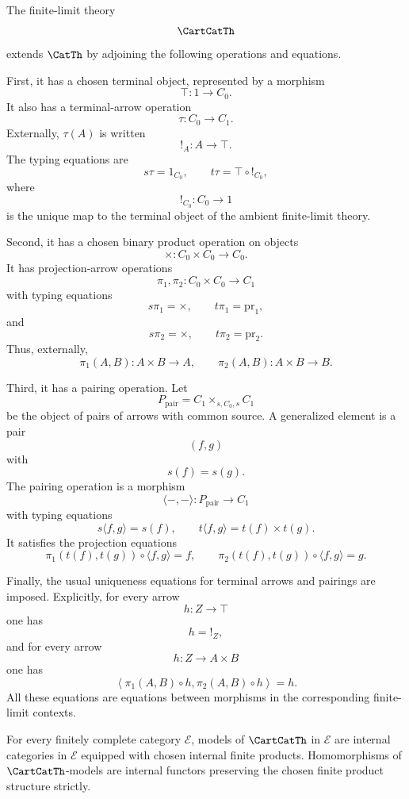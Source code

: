 \begin{definition}
\label{def:cartcatth}
The finite-limit theory
\[
\CartCatTh
\]
extends \(\CatTh\) by adjoining the following operations and equations.

First, it has a chosen terminal object, represented by a morphism
\[
\top:1\to C_0.
\]
It also has a terminal-arrow operation
\[
\tau:C_0\to C_1.
\]
Externally, \(\tau(A)\) is written
\[
!_A:A\to \top.
\]
The typing equations are
\[
s\tau=1_{C_0},
\qquad
t\tau=\top\circ {!}_{C_0},
\]
where
\[
{!}_{C_0}:C_0\to 1
\]
is the unique map to the terminal object of the ambient finite-limit theory.

Second, it has a chosen binary product operation on objects
\[
\times:C_0\times C_0\to C_0.
\]
It has projection-arrow operations
\[
\pi_1,\pi_2:C_0\times C_0\to C_1
\]
with typing equations
\[
s\pi_1=\times,
\qquad
t\pi_1=\mathrm{pr}_1,
\]
and
\[
s\pi_2=\times,
\qquad
t\pi_2=\mathrm{pr}_2.
\]
Thus, externally,
\[
\pi_1(A,B):A\times B\to A,
\qquad
\pi_2(A,B):A\times B\to B.
\]

Third, it has a pairing operation.  Let
\[
P_{\mathrm{pair}}
=
C_1\times_{s,C_0,s}C_1
\]
be the object of pairs of arrows with common source.  A generalized element is
a pair
\[
(f,g)
\]
with
\[
s(f)=s(g).
\]
The pairing operation is a morphism
\[
\langle-,-\rangle:P_{\mathrm{pair}}\to C_1
\]
with typing equations
\[
s\langle f,g\rangle=s(f),
\qquad
t\langle f,g\rangle=t(f)\times t(g).
\]
It satisfies the projection equations
\[
\pi_1(t(f),t(g))\circ\langle f,g\rangle=f,
\qquad
\pi_2(t(f),t(g))\circ\langle f,g\rangle=g.
\]

Finally, the usual uniqueness equations for terminal arrows and pairings are
imposed.  Explicitly, for every arrow
\[
h:Z\to \top
\]
one has
\[
h=!_Z,
\]
and for every arrow
\[
h:Z\to A\times B
\]
one has
\[
\left\langle
\pi_1(A,B)\circ h,
\pi_2(A,B)\circ h
\right\rangle
=
h.
\]
All these equations are equations between morphisms in the corresponding
finite-limit contexts.
\end{definition}

\begin{proposition}
\label{prop:models-cartcatth}
For every finitely complete category \(\mathcal E\), models of
\(\CartCatTh\) in \(\mathcal E\) are internal categories in \(\mathcal E\)
equipped with chosen internal finite products.  Homomorphisms of
\(\CartCatTh\)-models are internal functors preserving the chosen finite
product structure strictly.
\end{proposition}

